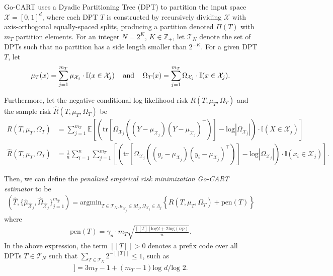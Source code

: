 \documentclass[12pt]{article}
\begin{document}
Go-CART uses a Dyadic Partitioning Tree (DPT) to partition the input space $\mathcal{X} = [0,1]^d$, where each DPT $T$ is constructed by recursively dividing $\mathcal{X}$ with axis-orthogonal equally-spaced splits, producing a partition denoted $\Pi(T)$ with $m_T$ partition elements. For an integer $N=2^K$, $K \in \mathbb{Z}_+$, let $\mathcal{T}_N$ denote the set of DPTs such that no partition has a side length smaller than $2^{-K}$. For a given DPT $T$, let
\begin{align}
    \mu_T(x) = \sum_{j=1}^{m_T} \mu_{\mathcal{X}_j} \cdot \mathbb{I}(x \in \mathcal{X}_j)
    \hspace{3mm} \text{ and } \hspace{3mm}
    \Omega_T(x) = \sum_{j=1}^{m_T} \Omega_{\mathcal{X}_j} \cdot \mathbb{I}(x \in \mathcal{X}_j).
\end{align}

Furthermore, let the negative conditional log-likelihood risk $R(T,\mu_T,\Omega_T)$ and the sample risk $\hat{R}(T,\mu_T,\Omega_T)$ be
\begin{align}
    R(T,\mu_T,\Omega_T) &= \sum_{j=1}^{m_T} \mathbb{E} \left[ \left( \text{tr} \left[ \Omega_{\mathcal{X}_j} \left( (Y - \mu_{\mathcal{X}_j})(Y - \mu_{\mathcal{X}_j})^{\top} \right) \right]  - \text{log} |\Omega_{\mathcal{X}_j} | \right)  \cdot \mathbb{I}(X \in \mathcal{X}_j) \right] \\
    \hat{R}(T,\mu_T,\Omega_T) &= \frac{1}{n} \sum_{i=1}^n \sum_{j=1}^{m_T} \left[ \left( \text{tr} \left[ \Omega_{\mathcal{X}_j} \left( (y_i - \mu_{\mathcal{X}_j})(y_i - \mu_{\mathcal{X}_j})^{\top} \right) \right]  - \text{log} |\Omega_{\mathcal{X}_j} | \right)  \cdot \mathbb{I}(x_i \in \mathcal{X}_j) \right].
\end{align}

Then, we can define the \emph{penalized empirical risk minimization Go-CART estimator} to be
\begin{align}
    \left( \hat{T}, \{ \hat{\mu}_{\hat{\mathcal{X}}_j}, \hat{\Omega}_{\hat{\mathcal{X}}_j} \}_{j=1}^{m_{\hat{T}}} \right) 
    = \text{argmin}_{T \in \mathcal{T}_N, \mu_{\mathcal{X}_j} \in M_j, \Omega_{\mathcal{X}_j} \in \Lambda_j} 
    \left\{ \hat{R}(T,\mu_T,\Omega_T) + \text{pen}(T) \right\}
\end{align}
where
\begin{align}
    \text{pen}(T) = \gamma_n \cdot m_T \sqrt{\frac{[[T]]\text{log}2 + 2\text{log}(np)}{n}}.
\end{align}
In the above expression, the term $[[T]] > 0$ denotes a prefix code over all DPTs $T \in \mathcal{T}_N$ such that $\sum_{T\in \mathcal{T}_N} 2^{-[[T]]} \leq 1$, such as
\begin{align}
    [[T]] = 3 m_T - 1 + (m_T - 1)\text{log }d / \text{log }2.
\end{align}
\end{document}
